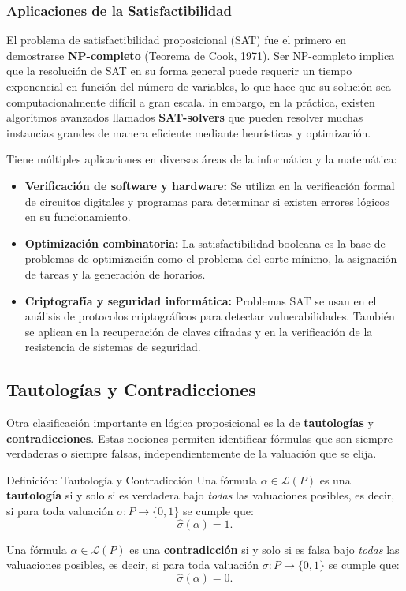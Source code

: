\subsubsection*{Aplicaciones de la Satisfactibilidad}

El problema de satisfactibilidad proposicional (SAT) fue el primero en demostrarse \textbf{NP-completo} (Teorema de Cook, 1971). Ser NP-completo implica que la resolución de SAT en su forma general puede requerir un tiempo exponencial en función del número de variables, lo que hace que su solución sea computacionalmente difícil a gran escala. in embargo, en la práctica, existen algoritmos avanzados llamados \textbf{SAT-solvers} que pueden resolver muchas instancias grandes de manera eficiente mediante heurísticas y optimización.

Tiene múltiples aplicaciones en diversas áreas de la informática y la matemática:

\begin{itemize}
  \item \textbf{Verificación de software y hardware:} Se utiliza en la verificación formal de circuitos digitales y programas para determinar si existen errores lógicos en su funcionamiento. 

  \item \textbf{Optimización combinatoria:} La satisfactibilidad booleana es la base de problemas de optimización como el problema del corte mínimo, la asignación de tareas y la generación de horarios.

\item \textbf{Criptografía y seguridad informática:} Problemas SAT se usan en el análisis de protocolos criptográficos para detectar vulnerabilidades. También se aplican en la recuperación de claves cifradas y en la verificación de la resistencia de sistemas de seguridad.


\end{itemize}



\subsection{Tautologías y Contradicciones}

Otra clasificación importante en lógica proposicional es la de \textbf{tautologías} y \textbf{contradicciones}. Estas nociones permiten identificar fórmulas que son siempre verdaderas o siempre falsas, independientemente de la valuación que se elija.

\begin{thmblock}{Definición: Tautología y Contradicción}
  Una fórmula \( \alpha \in \mathcal{L}(P) \) es una \textbf{tautología} si y solo si es verdadera bajo \emph{todas} las valuaciones posibles, es decir, si para toda valuación \( \sigma \colon P \to \{0,1\} \) se cumple que:
  \[
    \hat{\sigma}(\alpha) = 1.
  \]
  
  Una fórmula \( \alpha \in \mathcal{L}(P) \) es una \textbf{contradicción} si y solo si es falsa bajo \emph{todas} las valuaciones posibles, es decir, si para toda valuación \( \sigma \colon P \to \{0,1\} \) se cumple que:
  \[
    \hat{\sigma}(\alpha) = 0.
  \]
\end{thmblock}

